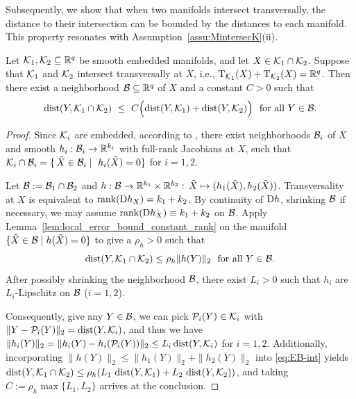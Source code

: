 Subsequently, we show that when two manifolds intersect transversally, the distance to their intersection can be bounded by the distances to each manifold. This property resonates with Assumption~\ref{assu:MintersecK}(ii).
\begin{lemma}\label{lem:transverse_local_error_bound}
Let $\mathcal{K}_1,\mathcal{K}_2\subseteq\mathbb{R}^q$ be smooth embedded manifolds, and let $X\in \mathcal{K}_1\cap\mathcal{K}_2$. Suppose that $\mathcal{K}_1$ and $\mathcal{K}_2$ intersect transversally at $X$, i.e., $\mathrm{T}_{\mathcal{K}_1}(X)+\mathrm{T}_{\mathcal{K}_2}(X)=\mathbb{R}^q$. Then there exist a neighborhood $\mathcal{B}\subseteq\mathbb{R}^q$ of $X$ and a constant $C>0$ such that
\[
\dist(Y,\kanifold_1\cap\kanifold_2)\ \le\ C\Bigl(\dist(Y,\kanifold_1)+\dist(Y,\kanifold_2)\Bigr)\ \ \text{for all}\ Y\in \neighbor.
\]
\end{lemma}

\begin{proof}
Since $\mathcal{K}_i$ are embedded, according to \cite[Theorem 8.75]{boumal2023introduction}, there exist neighborhoods $\mathcal{B}_i$ of $X$ and smooth $h_i:\mathcal{B}_i\to\mathbb{R}^{k_i}$ with full-rank Jacobians at $X$, such that $\mathcal{K}_i\cap \mathcal{B}_i=\{\,\tilde X\in \mathcal{B}_i\mid\ h_i(\tilde X)=0\}$ for $i=1,2$.

Let $\mathcal{B}:=\mathcal{B}_1\cap \mathcal{B}_2$ and $h:\mathcal{B}\to \mathbb{R}^{k_1}\times \mathbb{R}^{k_2}:\, \tilde{X}\mapsto(h_1(\tilde{X}),h_2(\tilde{X}))$. Transversality at $X$ is equivalent to $\operatorname{rank}(\mathrm{D} h_X)=k_1+k_2$. By continuity of $\mathrm{D} h$, shrinking $\mathcal{B}$ if necessary, we may assume $\operatorname{rank}(\mathrm{D} h_X)\equiv k_1+k_2$ on $\mathcal{B}$. Apply Lemma~\ref{lem:local_error_bound_constant_rank} on the manifold $\{\tilde{X}\in \mathcal{B}\mid h(\tilde{X})=0\}$
to give a $\rho_h>0$ such that
\begin{equation}\label{eq:EB-int}
\operatorname{dist}(Y,\mathcal{K}_1\cap\mathcal{K}_2)\le\rho_h\|h(Y)\|_2
\ \ \text{for all}\ Y\in\mathcal{B}.
\end{equation}
After possibly shrinking the neighborhood $\mathcal{B}$, there exist $L_i>0$ such that $h_i$ are $L_i$-Lipschitz on $\mathcal{B}$ ($i=1,2$). 

Consequently, give any $Y\in\mathcal{B}$, we can pick $\mathcal{P}_i(Y)\in\mathcal{K}_i$ with $\|Y-\mathcal{P}_i(Y)\|_2=\operatorname{dist}(Y,\mathcal{K}_i)$, and thus we have $\|h_i(Y)\|_2=\|h_i(Y)-h_i(\mathcal{P}_i(Y))\|_2\le L_i\operatorname{dist}(Y,\mathcal{K}_i)$ for $i=1,2$. Additionally, incorporating $\|h(Y)\|_2\le \|h_1(Y)\|_2+\|h_2(Y)\|_2$ into \eqref{eq:EB-int} yields $\operatorname{dist}(Y,\mathcal{K}_1\cap\mathcal{K}_2)\le\rho_h\!\left(L_1\,\operatorname{dist}(Y,\mathcal{K}_1)+L_2\,\operatorname{dist}(Y,\mathcal{K}_2)\right)$, and taking $C:=\rho_h\max\{L_1,L_2\}$ arrives at the conclusion.
\end{proof}

